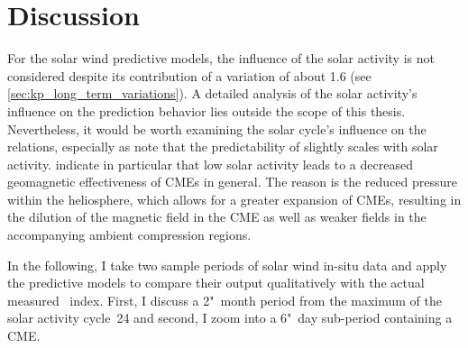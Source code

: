 \section{Discussion}
\label{sec:discussion_ch2}
For the solar wind predictive \Kp{} models, the influence of the solar activity is not considered despite its contribution of a \Kp{} variation of about 1.6 (see \autoref{sec:kp_long_term_variations}). A detailed analysis of the solar activity's influence on the \Kp{} prediction behavior lies outside the scope of this thesis. Nevertheless, it would be worth examining the solar cycle's influence on the relations, especially as \citet{Wing2005} note that the predictability of \Kp{} slightly scales with solar activity.
\citet{Gopalswamy2014} indicate in particular that low solar activity leads to a decreased geomagnetic effectiveness of CMEs in general. The reason is the reduced pressure within the heliosphere, which allows for a greater expansion of CMEs, resulting in the dilution of the magnetic field in the CME as well as weaker fields in the accompanying ambient compression regions.


In the following, I take two sample periods of solar wind in-situ data and apply the predictive \Kp{} models to compare their output qualitatively with the actual measured \Kp~index. First, I discuss a 2"~month period from the maximum of the solar activity cycle~24 and second, I zoom into a 6"~day sub-period containing a CME.

